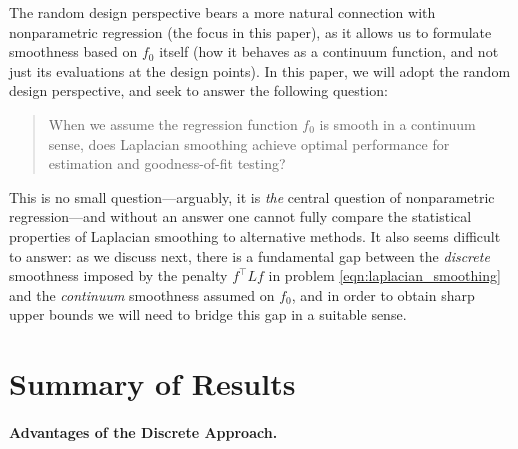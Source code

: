 \documentclass[twoside]{article}
\newcommand{\1}{\mathbf{1}}
\newcommand{\Lap}{L}
\theoremstyle{definition}
\theoremstyle{remark}
\begin{document}
The random design perspective bears a more natural connection with nonparametric regression (the focus in this paper), as it allows us to formulate smoothness based on $f_0$ itself (how it behaves as a continuum function, and not just its evaluations at the design points). In this paper, we will adopt the random design perspective, and seek to answer the following question:
\begin{quote}{When we assume the regression function $f_0$ is smooth in a continuum sense, does Laplacian smoothing achieve optimal performance for estimation and goodness-of-fit testing?} 
\end{quote}
This is no small question---arguably, it is \emph{the} central question of nonparametric regression---and without an answer one cannot fully compare the statistical properties of Laplacian smoothing to alternative methods. It also seems difficult to answer: as we discuss next, there is a fundamental gap between the \emph{discrete} smoothness imposed by the penalty $f^\top \Lap f$ in problem \eqref{eqn:laplacian_smoothing} and the \emph{continuum} smoothness assumed on $f_0$, and in order to obtain sharp upper bounds we will need to bridge this gap in a suitable sense.

\section{Summary of Results}

\paragraph{Advantages of the Discrete Approach.} 
\end{document}
